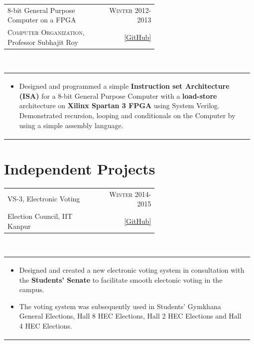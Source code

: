\documentclass[a4paper]{article} %
\newcommand{\verticalspacing}{-0.25cm}
\newcommand{\bulletspace}{0.7cm}
\newcommand{\projectheadspacing}{6.9cm}
\newcommand{\cproject}[5]{%
    \begin{tabular}{p{0.60\linewidth}r}
        \textcolor{NavyBlue}{\small #2} & \multicolumn{1}{m{ \projectheadspacing{} }}{\raggedleft \small {\textsc{#1}}}\\
        \small {#3} & \small {#4}
    \end{tabular}\\
    \begin{tabular}{p{0.98\linewidth}}
    \vspace{-0.3cm}
        \small{#5}
    \end{tabular}
    \vspace{\verticalspacing{}}
}
\begin{document}
\cproject
    {Winter 2012-2013}
    {8-bit General Purpose Computer on a FPGA}
    {\textsc{Computer Organization}, Professor Subhajit Roy}
    {\href{https://github.com/srijanshetty/220\_y11} {[GitHub]}}
    {%
        \begin{itemize}[leftmargin=\bulletspace{}]
            \item Designed and programmed a simple \textbf{Instruction set Architecture (ISA)} for a 8-bit General
                Purpose Computer with a \textbf{load-store}
                architecture on \textbf{Xilinx Spartan 3 FPGA} using System Verilog.  Demonstrated recursion, looping
                and conditionals on the Computer by using a simple assembly language.
        \end{itemize}
    }


\section{Independent Projects}

\cproject
    {Winter 2014-2015}
    {VS-3, Electronic Voting}
    {Election Council, IIT Kanpur}
    {\href{https://github.com/srijanshetty/elections} {\small{[GitHub]}}}
    {%
        \begin{itemize}[leftmargin=\bulletspace{}]
            \item Designed and created a new electronic voting system in consultation with the \textbf{Students' Senate}
                to facilitate smooth electonic voting in the campus.
            \item The voting system was subsequently used in Students'
                Gymkhana General Elections, Hall 8 HEC Elections, Hall 2 HEC Elections and Hall 4 HEC Elections.
        \end{itemize}
    }
\end{document}
